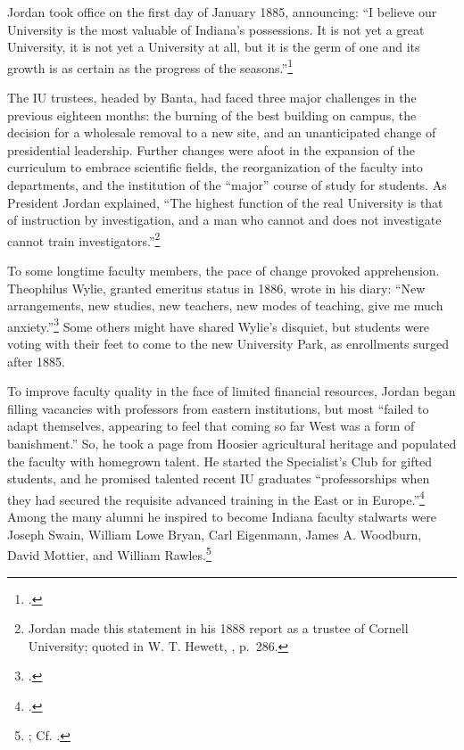 \documentclass[
  american,
  letterpaper,
]{scrreprt}
\begin{document}
Jordan took office on the first day of January 1885, announcing: ``I
believe our University is the most valuable of Indiana's possessions. It
is not yet a great University, it is not yet a University at all, but it
is the germ of one and its growth is as certain as the progress of the
seasons.''\footnote{.}

The IU trustees, headed by Banta, had faced three major challenges in
the previous eighteen months: the burning of the best building on
campus, the decision for a wholesale removal to a new site, and an
unanticipated change of presidential leadership. Further changes were
afoot in the expansion of the curriculum to embrace scientific fields,
the reorganization of the faculty into departments, and the institution
of the ``major'' course of study for students. As President Jordan
explained, ``The highest function of the real University is that of
instruction by investigation, and a man who cannot and does not
investigate cannot train investigators.''\footnote{Jordan made this
  statement in his 1888 report as a trustee of Cornell University;
  quoted in W. T. Hewett, , p.~286.}

To some longtime faculty members, the pace of change provoked
apprehension. Theophilus Wylie, granted emeritus status in 1886, wrote
in his diary: ``New arrangements, new studies, new teachers, new modes
of teaching, give me much anxiety.''\footnote{.} Some
others might have shared Wylie's disquiet, but students were voting with
their feet to come to the new University Park, as enrollments surged
after 1885.

To improve faculty quality in the face of limited financial resources,
Jordan began filling vacancies with professors from eastern
institutions, but most ``failed to adapt themselves, appearing to feel
that coming so far West was a form of banishment.'' So, he took a page
from Hoosier agricultural heritage and populated the faculty with
homegrown talent. He started the Specialist's Club for gifted students,
and he promised talented recent IU graduates ``professorships when they
had secured the requisite advanced training in the East or in
Europe.''\footnote{.} Among the many alumni he inspired to become Indiana faculty
stalwarts were Joseph Swain, William Lowe Bryan, Carl Eigenmann, James
A. Woodburn, David Mottier, and William Rawles.\footnote{; Cf. .}
\end{document}
